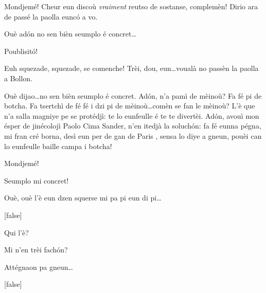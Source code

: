 \begin{drama}

\Brunospeaks {} Mondjemé! Cheur eun discoù \textit{vraiment} reutso de sostanse,  complemèn!  Dirio ara de passé la paolla eunc\'o a vo.

\Jordyspeaks Ouè ad\'on no sen bièn seumplo é concret\ldots

\Brunospeaks Poublisit\'o!



\Brunospeaks {} Euh squezade, squezade, se comenche! Trèi, dou, eun\ldots voualà no passèn la paolla a Bollon.

\Jordyspeaks Ouè dijao\ldots no sen bièn seumplo é concret. Ad\'on, n'a pamì de mèinoù? Fa fé pi de botcha. Fa tsertchì de fé fé i dzi pi de mèinoù\ldots comèn se fan le mèinoù? L'è que n'a salla magniye pe se protédjì: te lo eunfeulle  é te te divertèi. Ad\'on, avouì mon ésper de jinécolojì Paolo Cima Sander, n'en itedjà la soluch\'on: fa fé eunna pégna, mi fran cré borna, desì eun per de gan de Paris \condom, sensa lo diye a gneun, pouèi can lo eunfeulle baille campa i botcha!

\Brunospeaks {} Mondjemé!

\Jordyspeaks Seumplo mi concret!

\Brunospeaks Ouè, ouè l'è eun dzen squerse mi pa pi eun di pi\ldots

[false]


\Brunospeaks Qui l'è?

\Noteospeaks Mi n'en trèi fach\'on?

\Brunospeaks Attégnaon pa gneun\ldots

[false]


\end{drama}
